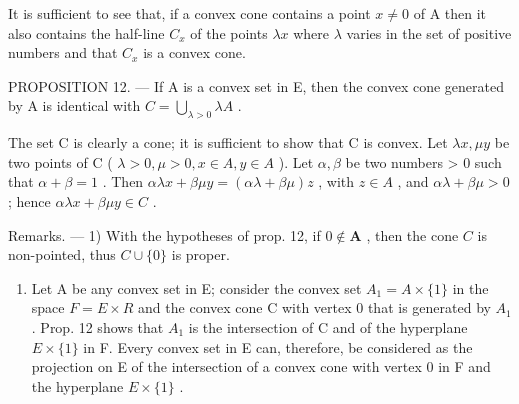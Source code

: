 It is sufficient to see that, if a convex cone contains a point \(x \neq 0\) of A then it also contains the half-line \(C_{x}\) of the points \(\lambda x\) where \(\lambda\) varies in the set of positive numbers and that \(C_{x}\) is a convex cone.

PROPOSITION 12. --- If A is a convex set in E, then the convex cone generated by A is identical with \(C = \bigcup_{\lambda > 0} \lambda A\) .

The set C is clearly a cone; it is sufficient to show that C is convex. Let \(\lambda x, \mu y\) be two points of C ( \(\lambda > 0, \mu > 0, x \in A, y \in A\) ). Let \(\alpha, \beta\) be two numbers \textgreater{} 0 such that \(\alpha + \beta = 1\) . Then \(\alpha \lambda x + \beta \mu y = (\alpha \lambda + \beta \mu) z\) , with \(z \in A\) , and \(\alpha \lambda + \beta \mu > 0\) ; hence \(\alpha \lambda x + \beta \mu y \in C\) .

Remarks. --- 1) With the hypotheses of prop. 12, if \(0 \notin \mathbf{A}\) , then the cone \(C\) is non-pointed, thus \(C \cup \{0\}\) is proper.

\begin{enumerate}
\def\labelenumi{\arabic{enumi})}
\setcounter{enumi}{1}
\tightlist
\item
  Let A be any convex set in E; consider the convex set \(A_{1} = A \times \{1\}\) in the space \(F = E \times R\) and the convex cone C with vertex 0 that is generated by \(A_{1}\) . Prop. 12 shows that \(A_{1}\) is the intersection of C and of the hyperplane \(E \times \{1\}\) in F. Every convex set in E can, therefore, be considered as the projection on E of the intersection of a convex cone with vertex 0 in F and the hyperplane \(E \times \{1\}\) .
\end{enumerate}

